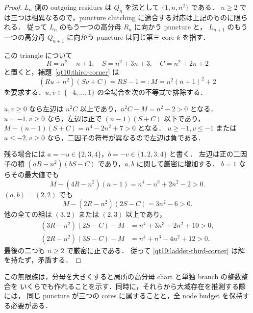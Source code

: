 \begin{proof}
$L_n$ 側の outgoing residues は $Q_n$ を法として $\{1,n,n^2\}$ である．
$n\ge2$ では三つは相異なるので，puncture clutching に適合する対応は上記のものに限られる．
従って $L_n$ のもう一つの高分母 $R_n$ に向かう puncture と，
$L_{n+1}$ のもう一つの高分母 $Q_{n+1}$ に向かう puncture は同じ第三 core $k$ を指す．

この triangle について
\[
 R=n^2-n+1,\quad S=n^2+3n+3,\quad C=n^2+2n+2
\]
と置くと，補題~\ref{qt10:third-corner} は
\begin{equation}\label{qt10:ladder-third-corner}
 (Ru+n^2)(Sv+C)=RS-1=:M=n^2(n+1)^2+2
\end{equation}
を要求する．$u,v\in\{-4,\ldots,1\}$ の全場合を次の不等式で排除する．

$u,v\ge0$ なら左辺は $n^2C$ 以上であり，$n^2C-M=n^2-2>0$ となる．
$u=-1,v\ge0$ なら，左辺は正で $(n-1)(S+C)$ 以下であり，
$M-(n-1)(S+C)=n^4-2n^2+7>0$ となる．
$u\ge-1,v\le-1$ または $u\le-2,v\ge0$ なら，二因子の符号が異なるので左辺は負である．

残る場合には $a=-u\in\{2,3,4\}$，$b=-v\in\{1,2,3,4\}$ と書く．
左辺は正の二因子の積 $(aR-n^2)(bS-C)$ であり，$a,b$ に関して厳密に増加する．
$b=1$ ならその最大値でも
\[
 M-(4R-n^2)(n+1)=n^4-n^3+2n^2-2>0.
\]
$(a,b)=(2,2)$ でも
\[
 M-(2R-n^2)(2S-C)=3n^2-6>0.
\]
他の全ての組は $(3,2)$ または $(2,3)$ 以上であり，
\begin{align*}
 (3R-n^2)(2S-C)-M&=n^4+3n^3-2n^2+10>0,\\
 (2R-n^2)(3S-C)-M&=n^4+n^3-4n^2+12>0.
\end{align*}
最後の二つも $n\ge2$ で厳密に正である．
従って \eqref{qt10:ladder-third-corner} は解を持たず，矛盾する．
\end{proof}

この無限族は，分母を大きくすると局所の高分母 chart と単独 branch の整数整合を
いくらでも作れることを示す．同時に，それらから大域存在を推測する際には，
同じ puncture が三つの cores に属することと，全 node budget を保持する必要がある．

